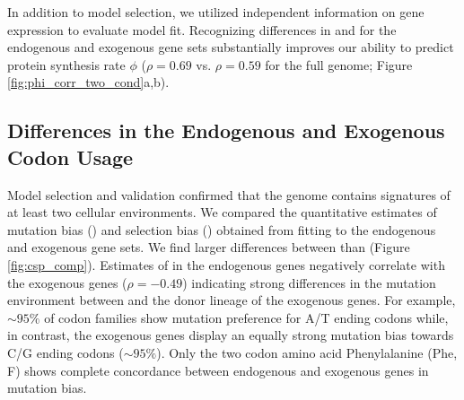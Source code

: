 \documentclass[12pt]{article}
\begin{document}
In addition to model selection, we utilized independent information on gene expression to evaluate model fit.
Recognizing differences in \DM and \DE for the endogenous and exogenous gene sets substantially improves our ability to predict protein synthesis rate $\phi$ ($\rho = 0.69$ vs. $\rho = 0.59$ for the full genome;  Figure \ref{fig:phi_corr_two_cond}a,b).

\subsection*{Differences in the Endogenous and Exogenous Codon Usage}

Model selection and validation confirmed that the \kluyveri genome contains signatures of at least two cellular environments.
We compared the quantitative estimates of mutation bias (\DM) and selection bias (\DE) obtained from fitting \ROC to the endogenous and exogenous gene sets.
We find larger differences between \DM than \DE (Figure \ref{fig:csp_comp}). 
Estimates of \DM in the endogenous genes negatively correlate with the exogenous genes ($\rho = -0.49$) indicating strong differences in the mutation environment between \kluyveri and the donor lineage of the exogenous genes.
For example, $\sim 95 \%$ of codon families show mutation preference for A/T ending codons while, in contrast, the exogenous genes display an equally strong mutation bias towards C/G ending codons ($\sim 95 \%$).
Only the two codon amino acid Phenylalanine (Phe, F) shows complete concordance between endogenous and exogenous genes in mutation bias.
\end{document}
